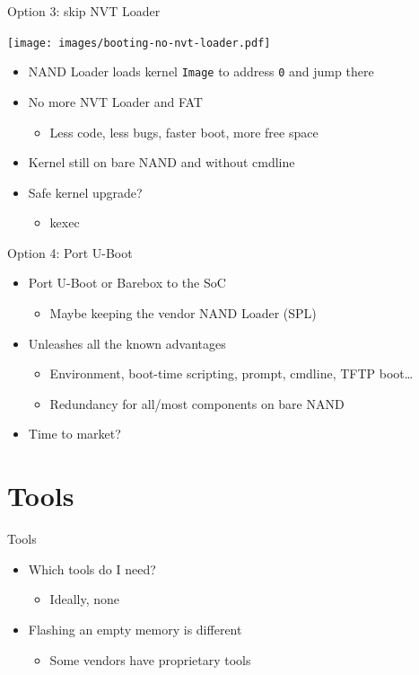 \documentclass[xetex,table]{beamer}
\begin{document}
\begin{frame}{Option 3: skip NVT Loader}
  \begin{center}
    \texttt{[image: images/booting-no-nvt-loader.pdf]}
  \end{center}
  \begin{itemize}
  \item NAND Loader loads kernel \texttt{Image} to address \texttt{0} and jump there
  \item No more NVT Loader and FAT
    \begin{itemize}
    \item Less code, less bugs, faster boot, more free space
    \end{itemize}
  \item Kernel still on bare NAND and without cmdline
  \item Safe kernel upgrade?
    \begin{itemize}
    \item kexec
    \end{itemize}
  \end{itemize}
\end{frame}

\begin{frame}{Option 4: Port U-Boot}
  \begin{itemize}
  \item Port U-Boot or Barebox to the SoC
    \begin{itemize}
    \item Maybe keeping the vendor NAND Loader (SPL)
    \end{itemize}
  \item Unleashes all the known advantages
    \begin{itemize}
    \item Environment, boot-time scripting, prompt, cmdline, TFTP boot\dots
    \item Redundancy for all/most components on bare NAND
    \end{itemize}
  \item Time to market?
  \end{itemize}
\end{frame}

\section{Tools}

\begin{frame}{Tools}
  \begin{itemize}
  \item Which tools do I need?
    \begin{itemize}
    \item Ideally, none
    \end{itemize}
  \item Flashing an empty memory is different
    \begin{itemize}
    \item Some vendors have proprietary tools
    \end{itemize}
  \end{itemize}
\end{frame}
\end{document}
